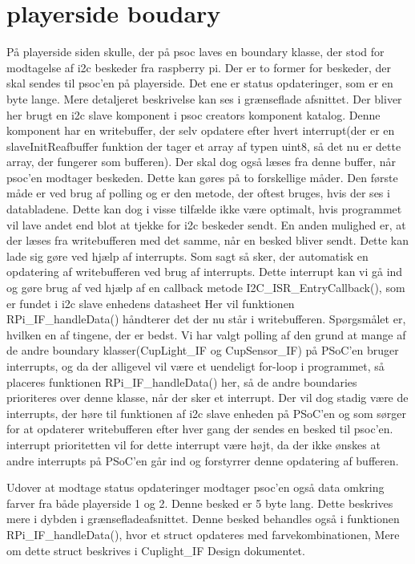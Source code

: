 \documentclass[Softwaredesign/Softwaredesign_main.tex]{subfiles}
\begin{document}
\section{playerside boudary}
På playerside siden skulle, der på psoc laves en boundary klasse, der stod for modtagelse af i2c beskeder fra raspberry pi. Der er to former for beskeder, der skal sendes til psoc'en på playerside. Det ene er status opdateringer, som er en byte lange. Mere detaljeret beskrivelse kan ses i grænseflade afsnittet. Der bliver her brugt en i2c slave komponent i psoc creators komponent katalog. Denne komponent har en writebuffer, der selv opdatere efter hvert interrupt(der er en slaveInitReafbuffer funktion der tager et array af typen uint8, så det nu er dette array, der fungerer som bufferen). Der skal dog også læses fra denne buffer, når psoc'en modtager beskeden. Dette kan gøres på to forskellige måder. Den første måde er ved brug af polling og er den metode, der oftest bruges, hvis der ses i databladene. Dette kan dog i visse tilfælde ikke være optimalt, hvis programmet vil lave andet end blot at tjekke for i2c beskeder sendt. En anden mulighed er, at der læses fra writebufferen med det samme, når en besked bliver sendt. Dette kan lade sig gøre ved hjælp af interrupts. Som sagt så sker, der automatisk en opdatering af writebufferen ved brug af interrupts. Dette interrupt kan vi gå ind og gøre brug af ved hjælp af en callback metode I2C\_ISR\_EntryCallback(), som er fundet i i2c slave enhedens datasheet Her vil funktionen RPi\_IF\_handleData() håndterer det der nu står i writebufferen. Spørgsmålet er, hvilken en af tingene, der er bedst. Vi har valgt polling af den grund at mange af de andre boundary klasser(CupLight\_IF og CupSensor\_IF) på PSoC'en bruger interrupts, og da der alligevel vil være et uendeligt for-loop i programmet, så placeres funktionen RPi\_IF\_handleData() her, så de andre boundaries prioriteres over denne klasse, når der sker et interrupt. Der vil dog stadig være de interrupts, der høre til funktionen af i2c slave enheden på PSoC'en og som sørger for at opdaterer writebufferen efter hver gang der sendes en besked til psoc'en. interrupt prioritetten vil for dette interrupt være højt, da der ikke ønskes at andre interrupts på PSoC'en går ind og forstyrrer denne opdatering af bufferen.  

Udover at modtage status opdateringer modtager psoc'en også data omkring farver fra både playerside 1 og 2. Denne besked er 5 byte lang. Dette beskrives mere i dybden i grænsefladeafsnittet. Denne besked behandles også i funktionen  RPi\_IF\_handleData(), hvor et struct opdateres med farvekombinationen, Mere om dette struct beskrives i Cuplight\_IF Design dokumentet. 
\end{document}
